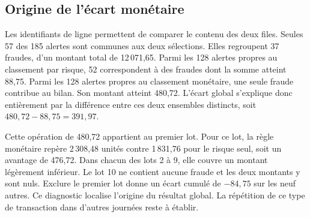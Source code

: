 \documentclass[11pt,a4paper]{article}
\begin{document}
\subsection{Origine de l'écart monétaire}

Les identifiants de ligne permettent de comparer le contenu des deux files. Seules 57 des 185 alertes sont communes aux deux sélections. Elles regroupent 37 fraudes, d'un montant total de 12\,071,65. Parmi les 128 alertes propres au classement par risque, 52 correspondent à des fraudes dont la somme atteint 88,75. Parmi les 128 alertes propres au classement monétaire, une seule fraude contribue au bilan. Son montant atteint 480,72. L'écart global s'explique donc entièrement par la différence entre ces deux ensembles distincts, soit $480{,}72-88{,}75=391{,}97$.

Cette opération de 480,72 appartient au premier lot. Pour ce lot, la règle monétaire repère 2\,308,48 unités contre 1\,831,76 pour le risque seul, soit un avantage de 476,72. Dans chacun des lots 2 à 9, elle couvre un montant légèrement inférieur. Le lot 10 ne contient aucune fraude et les deux montants y sont nuls. Exclure le premier lot donne un écart cumulé de $-84{,}75$ sur les neuf autres. Ce diagnostic localise l'origine du résultat global. La répétition de ce type de transaction dans d'autres journées reste à établir.
\end{document}
